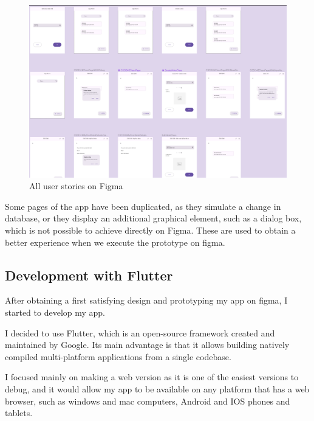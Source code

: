 \documentclass[]{article}
\begin{document}
	\begin{figure}[!htb]
		\centering
		\includegraphics[scale=0.3]{figma_user_stories_finish}
		\caption{All user stories on Figma}
	\end{figure}
	
	Some pages of the app have been duplicated, as they simulate a change in database, or they display an additional graphical element, such as a dialog box, which is not possible to achieve directly on Figma.\linebreak
	These are used to obtain a better experience when we execute the prototype on figma.
	
	\pagebreak
	
	\subsection{Development with Flutter}
	
	After obtaining a first satisfying design and prototyping my app on figma, I started to develop my app.\linebreak
	
	I decided to use Flutter, which is an open-source framework created and maintained by Google.
	Its main advantage is that it allows building natively compiled multi-platform applications from a single codebase.\linebreak
	
	I focused mainly on making a web version as it is one of the easiest versions to debug, and it would allow my app to be available on any platform that has a web browser, such as windows and mac computers, Android and IOS phones and tablets.\linebreak
	
\end{document}
